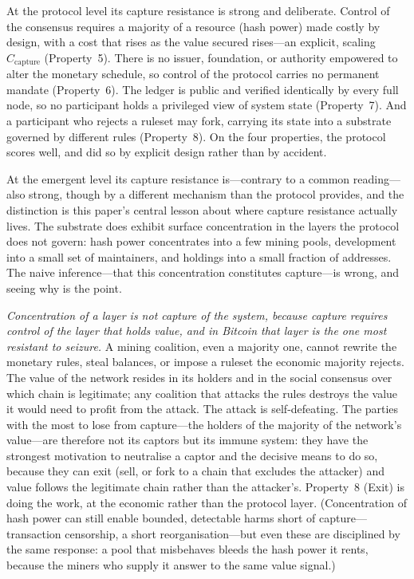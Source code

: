 \documentclass[11pt]{article}
\theoremstyle{definition}
\theoremstyle{plain}
\begin{document}
At the protocol level its capture resistance is strong and deliberate. Control of
the consensus requires a majority of a resource (hash power) made costly by design,
with a cost that rises as the value secured rises---an explicit, scaling
$C_{\text{capture}}$ (Property~5). There is no issuer, foundation, or authority
empowered to alter the monetary schedule, so control of the protocol carries no
permanent mandate (Property~6). The ledger is public and verified identically by
every full node, so no participant holds a privileged view of system state
(Property~7). And a participant who rejects a ruleset may fork, carrying its state
into a substrate governed by different rules (Property~8). On the four properties,
the protocol scores well, and did so by explicit design rather than by accident.

At the emergent level its capture resistance is---contrary to a common reading---
also strong, though by a different mechanism than the protocol provides, and the
distinction is this paper's central lesson about where capture resistance actually
lives. The substrate does exhibit surface concentration in the layers the protocol
does not govern: hash power concentrates into a few mining pools, development into a
small set of maintainers, and holdings into a small fraction of addresses. The naive
inference---that this concentration constitutes capture---is wrong, and seeing why
is the point.

\emph{Concentration of a layer is not capture of the system, because capture
requires control of the layer that holds value, and in Bitcoin that layer is the one
most resistant to seizure.} A mining coalition, even a majority one, cannot rewrite
the monetary rules, steal balances, or impose a ruleset the economic majority
rejects. The value of the network resides in its holders and in the social consensus
over which chain is legitimate; any coalition that attacks the rules destroys the
value it would need to profit from the attack. The attack is self-defeating. The
parties with the most to lose from capture---the holders of the majority of the
network's value---are therefore not its captors but its immune system: they have the
strongest motivation to neutralise a captor and the decisive means to do so, because
they can exit (sell, or fork to a chain that excludes the attacker) and value follows
the legitimate chain rather than the attacker's. Property~8 (Exit) is doing the work,
at the economic rather than the protocol layer. (Concentration of hash power can
still enable bounded, detectable harms short of capture---transaction censorship, a
short reorganisation---but even these are disciplined by the same response: a pool
that misbehaves bleeds the hash power it rents, because the miners who supply it
answer to the same value signal.)
\end{document}

